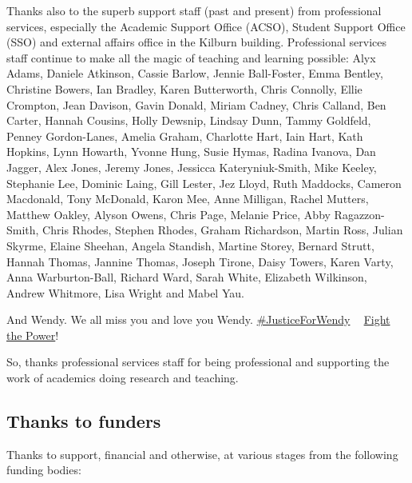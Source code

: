 \documentclass[
]{book}
\begin{document}
Thanks also to the superb support staff (past and present) from professional services, especially the Academic Support Office (ACSO), Student Support Office (SSO) and external affairs office in the Kilburn building. Professional services staff continue to make all the magic of teaching and learning possible: Alyx Adams, Daniele Atkinson, Cassie Barlow, Jennie Ball-Foster, Emma Bentley, Christine Bowers, Ian Bradley, Karen Butterworth, Chris Connolly, Ellie Crompton, Jean Davison, Gavin Donald, Miriam Cadney, Chris Calland, Ben Carter, Hannah Cousins, Holly Dewsnip, Lindsay Dunn, Tammy Goldfeld, Penney Gordon-Lanes, Amelia Graham, Charlotte Hart, Iain Hart, Kath Hopkins, Lynn Howarth, Yvonne Hung, Susie Hymas, Radina Ivanova, Dan Jagger, Alex Jones, Jeremy Jones, Jessicca Kateryniuk-Smith, Mike Keeley, Stephanie Lee, Dominic Laing, Gill Lester, Jez Lloyd, Ruth Maddocks, Cameron Macdonald, Tony McDonald, Karon Mee, Anne Milligan, Rachel Mutters, Matthew Oakley, Alyson Owens, Chris Page, Melanie Price, Abby Ragazzon-Smith, Chris Rhodes, Stephen Rhodes, Graham Richardson, Martin Ross, Julian Skyrme, Elaine Sheehan, Angela Standish, Martine Storey, Bernard Strutt, Hannah Thomas, Jannine Thomas, Joseph Tirone, Daisy Towers, Karen Varty, Anna Warburton-Ball, Richard Ward, Sarah White, Elizabeth Wilkinson, Andrew Whitmore, Lisa Wright and Mabel Yau.

And Wendy. We all miss you and love you Wendy. \href{https://www.justgiving.com/crowdfunding/byte-cafe}{\#JusticeForWendy} ✊🏽 \href{https://en.wikipedia.org/wiki/Fight_the_Power_(Public_Enemy_song)}{Fight the Power}! ✊🏽 \citep{fightthepower}

So, thanks professional services staff for being professional and supporting the work of academics doing research and teaching. 🙏

\hypertarget{funding}{%
\subsection{Thanks to funders}\label{funding}}

Thanks to support, financial and otherwise, at various stages from the following funding bodies:
\end{document}
